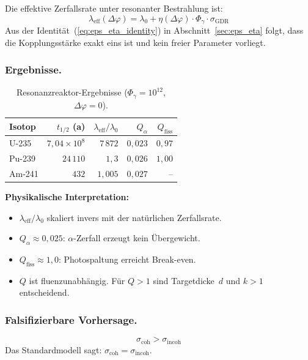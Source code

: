 \documentclass[12pt]{iopart}
\begin{document}
	Die effektive Zerfallsrate unter resonanter
	Bestrahlung ist:
	\begin{equation}
		\lambda_{\mathrm{eff}}(\Delta\varphi)
		= \lambda_0
		+ \eta(\Delta\varphi) \cdot \Phi_\gamma
		\cdot \sigma_{\mathrm{GDR}}
		\label{eq:lambda_eff}
	\end{equation}
	Aus der Identit\"at~(\ref{eq:eps_eta_identity}) in
	Abschnitt~\ref{sec:eps_eta} folgt, dass die
	Kopplungsst\"arke exakt eins ist und kein freier
	Parameter vorliegt.
	
	\subsubsection{Ergebnisse.}
	
	\begin{table}[ht]
		\centering
		\caption{Resonanzreaktor-Ergebnisse
			($\Phi_\gamma = 10^{12}$,
			$\Delta\varphi = 0$).}
		\label{tab:reaktor}
		\begin{tabular}{lrrrr}
			\hline
			Isotop & $t_{1/2}$ (a)
			& $\lambda_{\mathrm{eff}}/\lambda_0$
			& $Q_\alpha$
			& $Q_{\mathrm{fiss}}$ \\
			\hline
			U-235 & $7{,}04 \times 10^8$
			& $7\,872$ & $0{,}023$ & $0{,}97$ \\
			Pu-239 & $24\,110$
			& $1{,}3$ & $0{,}026$ & $1{,}00$ \\
			Am-241 & $432$
			& $1{,}005$ & $0{,}027$ & -- \\
			\hline
		\end{tabular}
	\end{table}
	
	\textbf{Physikalische Interpretation:}
	\begin{itemize}
		\item $\lambda_{\mathrm{eff}}/\lambda_0$
		skaliert invers mit der nat\"urlichen
		Zerfallsrate.
		\item $Q_\alpha \approx 0{,}025$:
		$\alpha$-Zerfall erzeugt kein \"Ubergewicht.
		\item $Q_{\mathrm{fiss}} \approx 1{,}0$:
		Photospaltung erreicht Break-even.
		\item $Q$ ist fluenzunabh\"angig.
		F\"ur $Q > 1$ sind Targetdicke~$d$ und
		$k > 1$ entscheidend.
	\end{itemize}
	
	\subsubsection{Falsifizierbare Vorhersage.}
	\begin{equation}
		\sigma_{\mathrm{coh}}
		> \sigma_{\mathrm{incoh}}
		\label{eq:prediction}
	\end{equation}
	Das Standardmodell sagt:
	$\sigma_{\mathrm{coh}}
	= \sigma_{\mathrm{incoh}}$.
	
\end{document}
